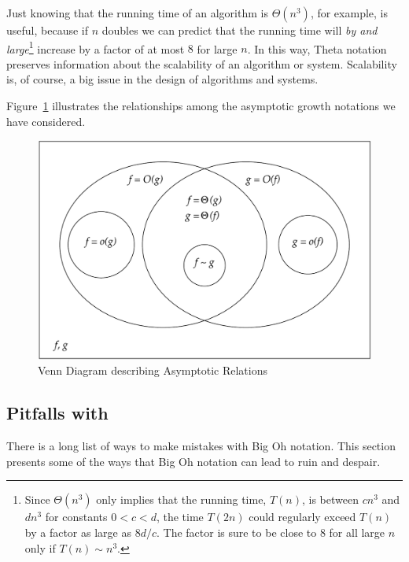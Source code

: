 Just knowing that the running time of an algorithm is $\varTheta(n^3)$, for
example, is useful, because if $n$ doubles we can predict that the running
time will \emph{by and large}\footnote{Since $\varTheta(n^3)$ only implies
that the running time, $T(n)$, is between $cn^3$ and $dn^3$ for constants
$0<c<d$, the time $T(2n)$ could regularly exceed $T(n)$ by a factor as large
as $8d/c$.  The factor is sure to be close to 8 for all large $n$ only if
$T(n) \sim n^3$.} increase by a factor of at most $8$ for large $n$.  In
this way, Theta notation preserves information about the scalability of an
algorithm or system.  Scalability is, of course, a big issue in the design
of algorithms and systems.

\begin{staffnotes}

Figure~\ref{asymp} illustrates the relationships among the asymptotic
growth notations we have considered.

\begin{figure}[h]
\begin{center}
\includegraphics[width=6in]{figures/asymp}
\end{center}
\caption{Venn Diagram describing Asymptotic Relations}
\label{asymp}
\end{figure}

\end{staffnotes}


\subsection{Pitfalls with }

There is a long list of ways to make mistakes with Big Oh notation.
This section presents some of the ways that Big Oh notation can lead
to ruin and despair.

